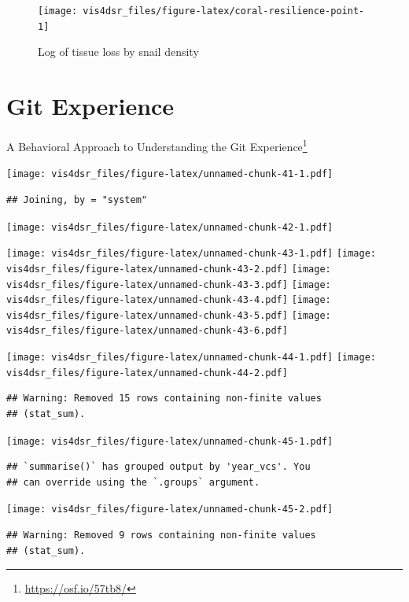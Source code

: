 \documentclass[
]{krantz}
\renewcommand{\href}[2]{#2\footnote{\url{#1}}}
\begin{document}
\begin{figure}
\texttt{[image: vis4dsr\_files/figure-latex/coral-resilience-point-1]} \caption{Log of tissue loss by snail density}\label{fig:coral-resilience-point}
\end{figure}

\hypertarget{git-experience}{%
\section*{Git Experience}\label{git-experience}}


\href{https://osf.io/57tb8/}{A Behavioral Approach to Understanding the Git Experience}

\texttt{[image: vis4dsr\_files/figure-latex/unnamed-chunk-41-1.pdf]}

\begin{verbatim}
## Joining, by = "system"
\end{verbatim}

\texttt{[image: vis4dsr\_files/figure-latex/unnamed-chunk-42-1.pdf]}

\texttt{[image: vis4dsr\_files/figure-latex/unnamed-chunk-43-1.pdf]} \texttt{[image: vis4dsr\_files/figure-latex/unnamed-chunk-43-2.pdf]} \texttt{[image: vis4dsr\_files/figure-latex/unnamed-chunk-43-3.pdf]} \texttt{[image: vis4dsr\_files/figure-latex/unnamed-chunk-43-4.pdf]} \texttt{[image: vis4dsr\_files/figure-latex/unnamed-chunk-43-5.pdf]} \texttt{[image: vis4dsr\_files/figure-latex/unnamed-chunk-43-6.pdf]}

\texttt{[image: vis4dsr\_files/figure-latex/unnamed-chunk-44-1.pdf]} \texttt{[image: vis4dsr\_files/figure-latex/unnamed-chunk-44-2.pdf]}

\begin{verbatim}
## Warning: Removed 15 rows containing non-finite values
## (stat_sum).
\end{verbatim}

\texttt{[image: vis4dsr\_files/figure-latex/unnamed-chunk-45-1.pdf]}

\begin{verbatim}
## `summarise()` has grouped output by 'year_vcs'. You
## can override using the `.groups` argument.
\end{verbatim}

\texttt{[image: vis4dsr\_files/figure-latex/unnamed-chunk-45-2.pdf]}

\begin{verbatim}
## Warning: Removed 9 rows containing non-finite values
## (stat_sum).
\end{verbatim}
\end{document}
